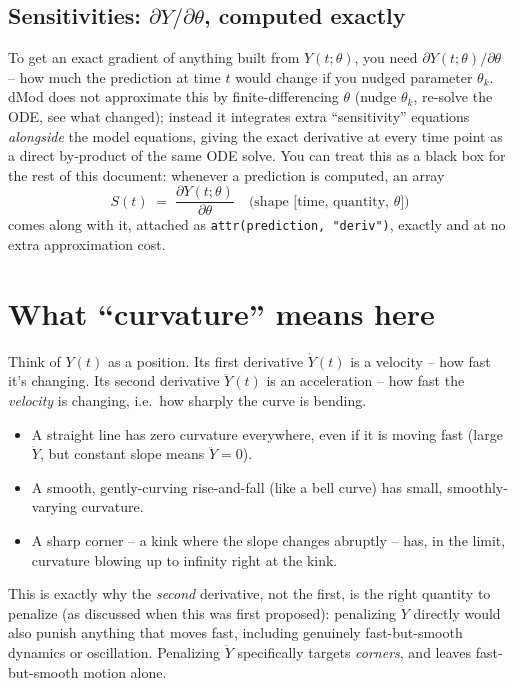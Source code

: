 \documentclass[11pt]{article}
\newcommand{\code}[1]{\texttt{#1}}
\begin{document}
\subsection{Sensitivities: $\partial Y/\partial\theta$, computed exactly}
To get an exact gradient of anything built from $Y(t;\theta)$, you need
$\partial Y(t;\theta)/\partial\theta$ -- how much the prediction at time $t$
would change if you nudged parameter $\theta_k$. dMod does not approximate
this by finite-differencing $\theta$ (nudge $\theta_k$, re-solve the ODE,
see what changed); instead it integrates extra ``sensitivity'' equations
\emph{alongside} the model equations, giving the exact derivative at every
time point as a direct by-product of the same ODE solve. You can treat this
as a black box for the rest of this document: whenever a prediction is
computed, an array
\[
  S(t) \;=\; \frac{\partial Y(t;\theta)}{\partial\theta} \quad
  \text{(shape [time, quantity, }\theta\text{])}
\]
comes along with it, attached as \code{attr(prediction, "deriv")}, exactly
and at no extra approximation cost.

\section{What ``curvature'' means here}

Think of $Y(t)$ as a position. Its first derivative $\dot Y(t)$ is a
velocity -- how fast it's changing. Its second derivative $\ddot Y(t)$ is an
acceleration -- how fast the \emph{velocity} is changing, i.e.\ how sharply
the curve is bending.

\begin{itemize}[nosep]
  \item A straight line has zero curvature everywhere, even if it is moving
  fast (large $\dot Y$, but constant slope means $\ddot Y = 0$).
  \item A smooth, gently-curving rise-and-fall (like a bell curve) has
  small, smoothly-varying curvature.
  \item A sharp corner -- a kink where the slope changes abruptly -- has, in
  the limit, curvature blowing up to infinity right at the kink.
\end{itemize}

This is exactly why the \emph{second} derivative, not the first, is the
right quantity to penalize (as discussed when this was first proposed):
penalizing $\dot Y$ directly would also punish anything that moves fast,
including genuinely fast-but-smooth dynamics or oscillation. Penalizing
$\ddot Y$ specifically targets \emph{corners}, and leaves fast-but-smooth
motion alone.
\end{document}
